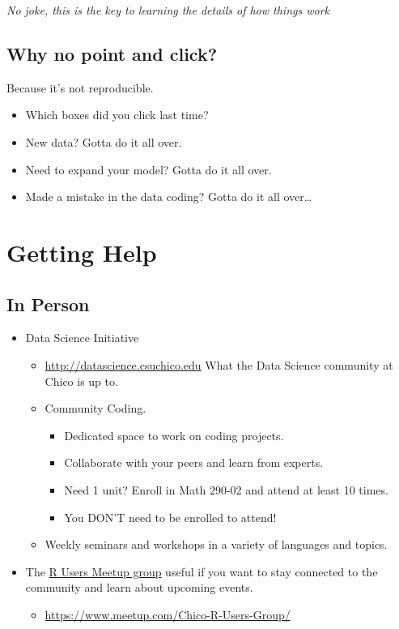 \documentclass[]{article}
\providecommand{\tightlist}{%
  \setlength{\itemsep}{0pt}\setlength{\parskip}{0pt}}
\begin{document}
\emph{No joke, this is the key to learning the details of how things
work}

\hypertarget{why-no-point-and-click}{%
\subsection{Why no point and click?}\label{why-no-point-and-click}}

Because it's not reproducible.

\begin{itemize}
\tightlist
\item
  Which boxes did you click last time?
\item
  New data? Gotta do it all over.
\item
  Need to expand your model? Gotta do it all over.
\item
  Made a mistake in the data coding? Gotta do it all over\ldots{}
\end{itemize}

\hypertarget{getting-help}{%
\section{Getting Help}\label{getting-help}}

\hypertarget{in-person}{%
\subsection{In Person}\label{in-person}}

\begin{itemize}
\tightlist
\item
  Data Science Initiative

  \begin{itemize}
  \tightlist
  \item
    \url{http://datascience.csuchico.edu} What the Data Science
    community at Chico is up to.
  \item
    Community Coding.

    \begin{itemize}
    \tightlist
    \item
      Dedicated space to work on coding projects.
    \item
      Collaborate with your peers and learn from experts.
    \item
      Need 1 unit? Enroll in Math 290-02 and attend at least 10 times.
    \item
      You DON'T need to be enrolled to attend!
    \end{itemize}
  \item
    Weekly seminars and workshops in a variety of languages and topics.
  \end{itemize}
\item
  The \href{https://www.meetup.com/Chico-R-Users-Group/}{R Users Meetup
  group} useful if you want to stay connected to the community and learn
  about upcoming events.

  \begin{itemize}
  \tightlist
  \item
    \url{https://www.meetup.com/Chico-R-Users-Group/}
  \end{itemize}
\end{itemize}
\end{document}
